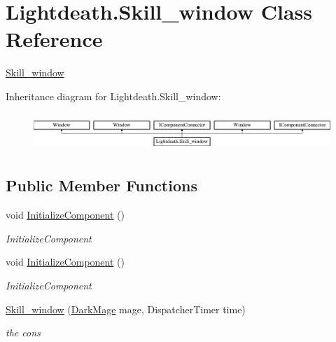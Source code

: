 \hypertarget{class_lightdeath_1_1_skill__window}{}\section{Lightdeath.\+Skill\+\_\+window Class Reference}
\label{class_lightdeath_1_1_skill__window}


\hyperlink{class_lightdeath_1_1_skill__window}{Skill\+\_\+window}  


Inheritance diagram for Lightdeath.\+Skill\+\_\+window\+:\begin{figure}[H]
\begin{center}
\leavevmode
\includegraphics[height=1.454545cm]{class_lightdeath_1_1_skill__window}
\end{center}
\end{figure}
\subsection*{Public Member Functions}
\begin{DoxyCompactItemize}
\item 
void \hyperlink{class_lightdeath_1_1_skill__window_ae0fbf1b9b98474974dfaa685f29a1bd2}{Initialize\+Component} ()
\begin{DoxyCompactList}\small\item\em Initialize\+Component \end{DoxyCompactList}\item 
void \hyperlink{class_lightdeath_1_1_skill__window_ae0fbf1b9b98474974dfaa685f29a1bd2}{Initialize\+Component} ()
\begin{DoxyCompactList}\small\item\em Initialize\+Component \end{DoxyCompactList}\item 
\hyperlink{class_lightdeath_1_1_skill__window_a5c88e8a767b1897ea475d92b44ef79b7}{Skill\+\_\+window} (\hyperlink{class_lightdeath_1_1_dark_mage}{Dark\+Mage} mage, Dispatcher\+Timer time)
\begin{DoxyCompactList}\small\item\em the cons \end{DoxyCompactList}\end{DoxyCompactItemize}

